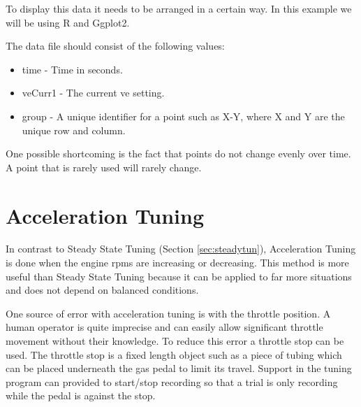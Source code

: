 \documentclass{article}
\begin{document}
To display this data it needs to be arranged in a certain way.
In this example we will be using R\cite{R} and Ggplot2\cite{wickham2009ggplot2}.

The data file should consist of the following values:
\begin{itemize}
\item time - Time in seconds.
\item veCurr1 - The current ve setting.
\item group - A unique identifier for a point such as X-Y, where
  X and Y are the unique row and column.
\end{itemize}

One possible shortcoming is the fact that points do not change
evenly over time.
A point that is rarely used will rarely change.

\section{Acceleration Tuning}
\label{sec:acctun}

In contrast to Steady State Tuning (Section \ref{sec:steadytun}), Acceleration
Tuning is done when the engine rpms are increasing or decreasing.
This method is more useful than Steady State Tuning because it can be
applied to far more situations and does not depend on balanced conditions.

One source of error with acceleration tuning is with the throttle position.
A human operator is quite imprecise and can easily allow significant
throttle movement without their knowledge.
To reduce this error a throttle stop can be used.
The throttle stop is a fixed length object such as a piece of tubing which
can be placed underneath the gas pedal to limit its travel.
Support in the tuning program can provided to start/stop recording so
that a trial is only recording while the pedal is against the stop.
\end{document}

